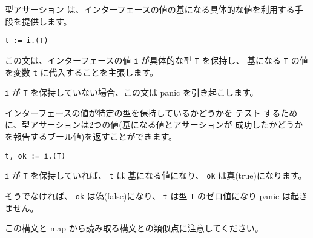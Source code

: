 型アサーション は、インターフェースの値の基になる具体的な値を利用する手段を提供します。

\begin{lstlisting}[numbers=none]
t := i.(T)
\end{lstlisting}
この文は、インターフェースの値 \texttt{i} が具体的な型 \texttt{T} を保持し、
基になる \texttt{T} の値を変数 \texttt{t} に代入することを主張します。

\texttt{i} が \texttt{T} を保持していない場合、この文は panic を引き起こします。

インターフェースの値が特定の型を保持しているかどうかを テスト
するために、型アサーションは2つの値(基になる値とアサーションが
成功したかどうかを報告するブール値)を返すことができます。

\begin{lstlisting}[numbers=none]
t, ok := i.(T)
\end{lstlisting}

\texttt{i} が \texttt{T} を保持していれば、 \texttt{t} は
基になる値になり、 \texttt{ok} は真(true)になります。

そうでなければ、 \texttt{ok} は偽(false)になり、 
\texttt{t} は型 \texttt{T} のゼロ値になり panic は起きません。

この構文と map から読み取る構文との類似点に注意してください。
